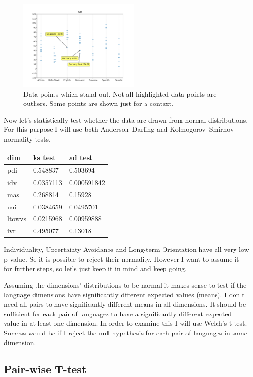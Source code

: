 \documentclass[a4paper,10pt]{article}
\begin{document}
\begin{figure}[H]
\begin{center}
              \includegraphics[width=6cm]{../figures/ivr.png}
       \end{center}
       \caption{Data points which stand out. Not all highlighted data points are outliers. Some points are shown just for a context.}
\end{figure}

Now let's statistically test whether the data are drawn from normal distributions.
For this purpose I will use both Anderson–Darling and Kolmogorov–Smirnov normality tests.

\begin{longtable}[]{@{}lll@{}}
\toprule
dim & ks test & ad test \\
\midrule
\endhead
pdi & 0.548837 & 0.503694 \\
idv & 0.0357113 & 0.000591842 \\
mas & 0.268814 & 0.15928 \\
uai & 0.0384659 & 0.0495701 \\
ltowvs & 0.0215968 & 0.00959888 \\
ivr & 0.495077 & 0.13018 \\
\bottomrule
\end{longtable}

Individuality, Uncertainty Avoidance and Long-term Orientation have all very low p-value.
So it is possible to reject their normality.
However I want to assume it for further steps, so let's just keep it in mind and keep going.

Assuming the dimensions' distributions to be normal it makes sense to test if the language dimensions have significantly different expected values (means).
I don't need all pairs to have significantly different means in all dimensions.
It should be sufficient for each pair of languages to have a significantly different expected value in at least one dimension.
In order to examine this I will use Welch's t-test.
Success would be if I reject the null hypothesis for each pair of languages in some dimension.

\subsection{Pair-wise T-test}
\end{document}
